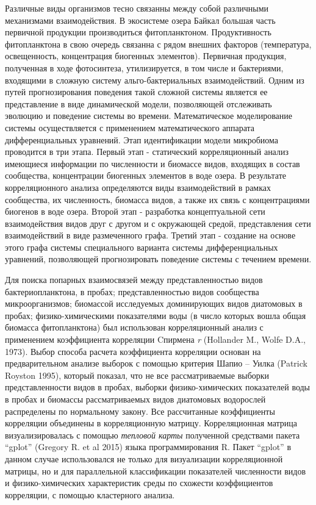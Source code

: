 \documentclass[a4paper,12pt,openany,final]{extreport}
\begin{document}
Различные виды организмов тесно связанны между собой различными
механизмами взаимодействия. В экосистеме озера Байкал большая часть
первичной продукции производиться фитопланктоном. Продуктивность
фитопланктона в свою очередь связанна с рядом внешних факторов
(температура, освещенность, концентрация биогенных элементов). Первичная
продукция, полученная в ходе фотосинтеза, утилизируется, в том числе и
бактериями, входящими в сложную систему альго-бактериальных
взаимодействий. Одним из путей прогнозирования поведения такой сложной
системы является ее представление в виде динамической модели,
позволяющей отслеживать эволюцию и поведение системы во времени.
Математическое моделирование системы осуществляется с применением
математического аппарата дифференциальных уравнений. Этап идентификации
модели микробиома проводится в три этапа. Первый этап - статический
корреляционный анализ имеющиеся информации по численности и биомассе
видов, входящих в состав сообщества, концентрации биогенных элементов в
воде озера. В результате корреляционного анализа определяются виды
взаимодействий в рамках сообщества, их численность, биомасса видов, а
также их связь с концентрациями биогенов в воде озера. Второй этап -
разработка концептуальной сети взаимодействия видов друг с другом и с
окружающей средой, представления сети взаимодействий в виде размеченного
графа. Третий этап - создание на основе этого графа системы специального
варианта системы дифференциальных уравнений, позволяющей прогнозировать
поведение системы с течением времени.

Для поиска попарных взаимосвязей между представленностью видов
бактериопланктона, в пробах; представленностью видов сообщества
микроорганизмов; биомассой исследуемых доминирующих видов диатомовых в
пробах; физико-химическими показателями воды (в число которых вошла
общая биомасса фитопланктона) был использован корреляционный анализ с
применением коэффициента корреляции Cпирмена \emph{r} (Hollander M.,
Wolfe D.A., 1973). Выбор способа расчета коэффициента корреляции основан
на предварительном анализе выборок с помощью критерия Шапио -- Уилка
(Patrick Royston 1995), который показал, что не все рассматриваемые
выборки представленности видов в пробах, выборки физико-химических
показателей воды в пробах и биомассы рассматриваемых видов диатомовых
водорослей распределены по нормальному закону. Все рассчитанные
коэффициенты корреляции объединены в корреляционную матрицу.
Корреляционная матрица визуализировалась с помощью \emph{тепловой карты}
полученной средствами пакета ``gplot'' (Gregory R. et al 2015) языка
программирования R. Пакет ``gplot'' в данном случае использовался не
только для визуализации корреляционной матрицы, но и для параллельной
классификации показателей численности видов и физико-химических
характеристик среды по схожести коэффициентов корреляции, с помощью
кластерного анализа.
\end{document}
